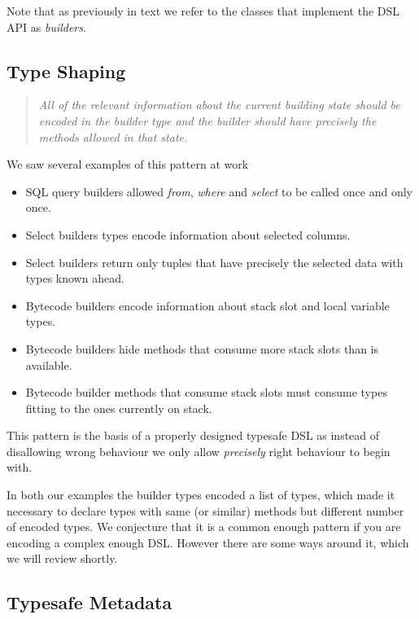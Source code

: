 \documentclass{sig-alternate}
\begin{document}
Note that as previously in text we refer to the classes that implement the DSL API as \emph{builders}. 

\subsection{Type Shaping}

\begin{quote}
\emph{All of the relevant information about the current building state should be encoded in the builder type and the builder should have precisely the methods allowed in that state.}
\end{quote}

We saw several examples of this pattern at work
\begin{itemize}
\item SQL query builders allowed \emph{from}, \emph{where} and \emph{select} to be called once and only once.
\item Select builders types encode information about selected columns. 
\item Select builders return only tuples that have precisely the selected data with types known ahead.
\item Bytecode builders encode information about stack slot and local variable types.
\item Bytecode builders hide methods that consume more stack slots than is available.
\item Bytecode builder methods that consume stack slots must consume types fitting to the ones currently on stack.
\end{itemize}

This pattern is the basis of a properly designed typesafe DSL as instead of disallowing wrong behaviour we only allow \emph{precisely} right behaviour to begin with. 

In both our examples the builder types encoded a list of types, which made it necessary to declare types with same (or similar) methods but different number of encoded types. We conjecture that it is a common enough pattern if you are encoding a complex enough DSL. However there are some ways around it, which we will review shortly.

\subsection{Typesafe Metadata}
\end{document}
